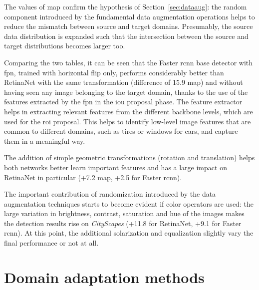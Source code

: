 \documentclass[%
    corpo=12pt,
    twoside,
    stile=classica,   
    tipotesi=magistrale,
    evenboxes,
    english,
	numerazioneromana,
]{toptesi}
\begin{document}
\bigskip
The values of \gls{map} confirm the hypothesis of Section~\ref{sec:dataaug}: the random component introduced by the fundamental data augmentation operations helps to reduce the mismatch between source and target domains. Presumably, the source data distribution is expanded such that the intersection between the source and target distributions becomes larger too.

Comparing the two tables, it can be seen that the Faster \gls{rcnn} base detector with \gls{fpn}, trained with horizontal flip only, performs considerably better than RetinaNet with the same transformation (difference of 15.9 \gls{map}) and without having seen any image belonging to the target domain, thanks to the use of the features extracted by the \gls{fpn} in the \gls{iou} proposal phase. The feature extractor helps in extracting relevant features from the different backbone levels, which are used for the \gls{roi} proposal. This helps to identify low-level image features that are common to different domains, such as tires or windows for cars, and capture them in a meaningful way.

The addition of simple geometric transformations (rotation and translation) helps both networks better learn important features and has a large impact on RetinaNet in particular (+7.2 \gls{map}, +2.5 for Faster \gls{rcnn}).

The important contribution of randomization introduced by the data augmentation techniques starts to become evident if color operators are used: the large variation in brightness, contrast, saturation and hue of the images makes the detection results rise on \textit{CityScapes} (+11.8 for RetinaNet, +9.1 for Faster \gls{rcnn}). At this point, the additional solarization and equalization slightly vary the final performance or not at all.

\section{Domain adaptation methods}
\end{document}
